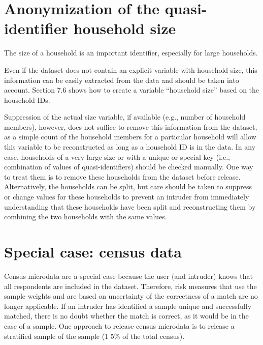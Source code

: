 \documentclass[letterpaper,10pt,english]{sphinxmanual}
\begin{document}
\section{Anonymization of the quasi-identifier household size}
\label{\detokenize{anon_methods:anonymization-of-the-quasi-identifier-household-size}}
The size of a household is an important identifier, especially for large
households. %
\begin{footnote}[22]\sphinxAtStartFootnote
Even if the dataset does not contain an explicit variable with
household size, this information can be easily extracted from the
data and should be taken into account. Section 7.6 shows how to
create a variable “household size” based on the household IDs.
%
\end{footnote}  Suppression of the actual size
variable, if available (e.g., number of household members), however,
does not suffice to remove this information from the dataset, as a
simple count of the household members for a particular household will
allow this variable to be reconstructed as long as a household ID is in
the data. In any case, households of a very large size or with a unique
or special key (i.e., combination of values of quasi-identifiers) should
be checked manually. One way to treat them is to remove these households
from the dataset before release. Alternatively, the households can be
split, but care should be taken to suppress or change values for these
households to prevent an intruder from immediately understanding that
these households have been split and reconstructing them by combining
the two households with the same values.


\section{Special case: census data}
\label{\detokenize{anon_methods:special-case-census-data}}
Census microdata are a special case because the user (and intruder)
knows that all respondents are included in the dataset. Therefore, risk
measures that use the sample weights and are based on uncertainty of the
correctness of a match are no longer applicable. If an intruder has
identified a sample unique and successfully matched, there is no doubt
whether the match is correct, as it would be in the case of a sample.
One approach to release census microdata is to release a stratified
sample of the sample (1 \textendash{} 5\% of the total census). 
\end{document}
